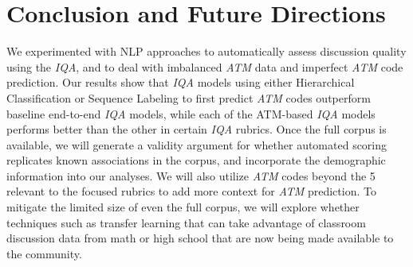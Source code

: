 \documentclass[runningheads]{llncs}
\begin{document}
\section{Conclusion and Future Directions}
We experimented with NLP approaches to automatically 
assess discussion quality using the \textit{IQA}, and
to deal with imbalanced \textit{ATM} data and imperfect \textit{ATM} code prediction.
Our results show that \textit{IQA}  models using either Hierarchical Classification or Sequence Labeling to first predict \textit{ATM} codes outperform baseline end-to-end \textit{IQA}  models, while each of the ATM-based \textit{IQA}  models performs better than the other in certain \textit{IQA}  rubrics. %
Once the full corpus is available, we will generate a validity argument 
for whether automated scoring replicates %
known associations in the corpus, and incorporate the demographic information into our analyses. We will  also utilize \textit{ATM} codes beyond the 5 relevant to the focused rubrics to add more context  for \textit{ATM} prediction. To mitigate the limited size of even the full corpus,  we will explore whether  techniques such as %
transfer learning that can take advantage of classroom discussion data from math
\cite{suresh2021using} or high school \cite{olshefski2020discussion} that are now being made available to the community. 






%
%
%


%




\end{document}
